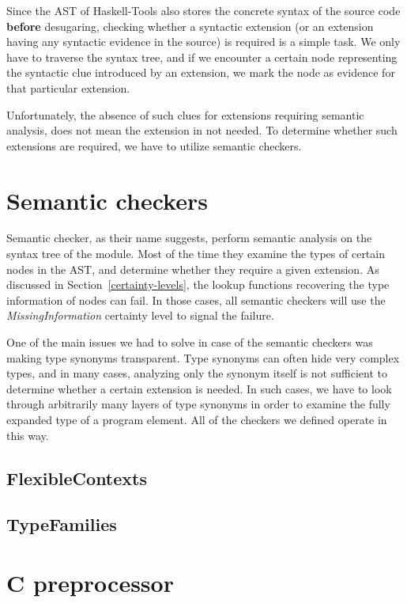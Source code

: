 \documentclass[main.tex]{subfiles}
\begin{document}
	Since the AST of Haskell-Tools also stores the concrete syntax of the source code \textbf{before} desugaring, checking whether a syntactic extension (or an extension having any syntactic evidence in the source) is required is a simple task. We only have to traverse the syntax tree, and if we encounter a certain node representing the syntactic clue introduced by an extension, we mark the node as evidence for that particular extension.
	
	Unfortunately, the absence of such clues for extensions requiring semantic analysis, does not mean the extension in not needed. To determine whether such extensions are required, we have to utilize semantic checkers.
	
	\section{Semantic checkers}
		
	Semantic checker, as their name suggests, perform semantic analysis on the syntax tree of the module. Most of the time they examine the types of certain nodes in the AST, and determine whether they require a given extension. As discussed in Section~\ref{certainty-levels}, the lookup functions recovering the type information of nodes can fail. In those cases, all semantic checkers will use the \emph{MissingInformation} certainty level to signal the failure.
	
	One of the main issues we had to solve in case of the semantic checkers was making type synonyms transparent. Type synonyms can often hide very complex types, and in many cases, analyzing only the synonym itself is not sufficient to determine whether a certain extension is needed. In such cases, we have to look through arbitrarily many layers of type synonyms in order to examine the fully expanded type of a program element. All of the checkers we defined operate in this way.

	\subsection{FlexibleContexts} \label{flexible-contexts}
	
	
	\subsection{TypeFamilies}
	
	
	\section{C preprocessor}
	
	
	
\end{document}
